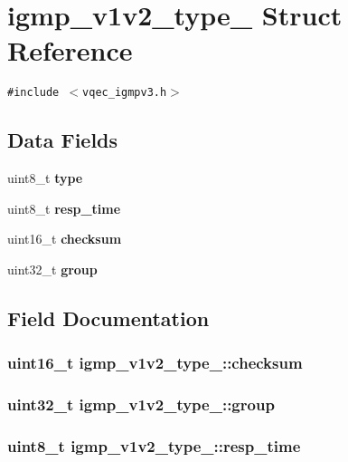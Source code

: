 \section{igmp\_\-v1v2\_\-type\_\- Struct Reference}
\label{structigmp__v1v2__type__}
{\tt \#include $<$vqec\_\-igmpv3.h$>$}

\subsection*{Data Fields}
\begin{CompactItemize}
\item 
uint8\_\-t \bf{type}
\item 
uint8\_\-t \bf{resp\_\-time}
\item 
uint16\_\-t \bf{checksum}
\item 
uint32\_\-t \bf{group}
\end{CompactItemize}


\subsection{Field Documentation}
\subsubsection{\setlength{\rightskip}{0pt plus 5cm}uint16\_\-t \bf{igmp\_\-v1v2\_\-type\_\-::checksum}}\label{structigmp__v1v2__type___697f33e97fa23956b4ab6804dc901c80}


\subsubsection{\setlength{\rightskip}{0pt plus 5cm}uint32\_\-t \bf{igmp\_\-v1v2\_\-type\_\-::group}}\label{structigmp__v1v2__type___c05ccfa0af42a4e602e9e291328ebc49}


\subsubsection{\setlength{\rightskip}{0pt plus 5cm}uint8\_\-t \bf{igmp\_\-v1v2\_\-type\_\-::resp\_\-time}}\label{structigmp__v1v2__type___562b24141ddc3e44a288844dd9200eed}


